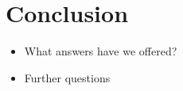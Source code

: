 \section{Conclusion} \label{sec:conclusion}

\begin{itemize}
\item What answers have we offered?
\item Further questions
\end{itemize}